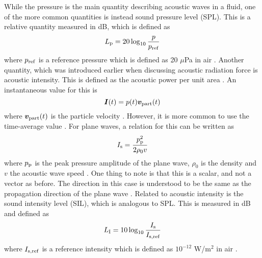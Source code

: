 \documentclass[11pt,twoside]{eitExjobb}
\begin{document}
	While the pressure is the main quantity describing acoustic waves in a fluid, one of the more common quantities is instead sound pressure level (SPL). This is a relative quantity measured in dB, which is defined as
	\begin{equation*}
		L_{\mathrm{p}} = 20 \log_{10}{\frac{p}{p_{\mathrm{ref}}}}
	\end{equation*}
	where $p_{\mathrm{ref}}$ is a reference pressure which is defined as 20 $\mu$Pa in air \cite{Rossing2014}. Another quantity, which was introduced earlier when discussing acoustic radiation force is acoustic intensity. This is defined as the acoustic power per unit area \cite{Rossing2014}. An instantaneous value for this is
	\begin{equation*}
		\bm{I}(t) = p(t) \bm{v}_{\mathrm{part}}(t)
	\end{equation*}
	where $\bm{v}_{\mathrm{part}}(t)$ is the particle velocity \cite{Rossing2014}. However, it is more common to use the time-average value \cite{Jacobsen1991}. For plane waves, a relation for this can be written as
	\begin{equation*}
		I_{\mathrm{s}} = \frac{p_{\mathrm{p}}^2}{2\rho_0 v}
	\end{equation*}
	where $p_{\mathrm{p}}$ is the peak pressure amplitude of the plane wave, $\rho_0$ is the density and $v$ the acoustic wave speed \cite{Rossing2014}. One thing to note is that this is a scalar, and not a vector as before. The direction in this case is understood to be the same as the propagation direction of the plane wave \cite{Rossing2014}. Related to acoustic intensity is the sound intensity level (SIL), which is analogous to SPL. This is measured in dB and defined as
	\begin{equation*}
		L_{\mathrm{I}} = 10 \log_{10}{\frac{I_{\mathrm{s}}}{I_{\mathrm{s,ref}}}}
	\end{equation*}
	where $I_{\mathrm{s,ref}}$ is a reference intensity which is defined as $10^{-12}$ W/m$^2$ in air \cite{Rossing2014}.
	
\end{document}
